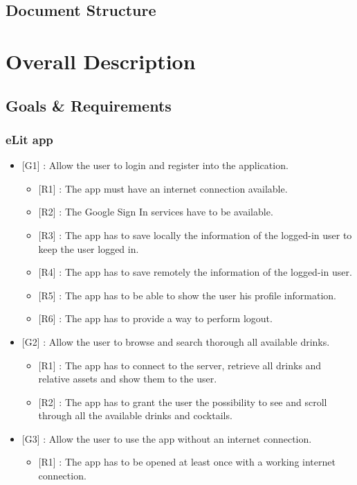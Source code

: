 \documentclass[paper=a4, fontsize=12pt]{scrartcl}
\numberwithin{equation}{section}		%
\numberwithin{figure}{section}			%
\numberwithin{table}{section}				%
\begin{document}
\subsection{Document Structure}
\newpage

\section{Overall Description}
\subsection{Goals \& Requirements}
\subsubsection{eLit app}
\begin{itemize}
\item {[G1]} : Allow the user to login and register into the application.
\begin{itemize}
\item {[R1]} : The app must have an internet connection available.
\item {[R2]} : The Google Sign In services have to be available.
\item {[R3]} : The app has to save locally the information of the logged-in user to keep the user logged in.
\item {[R4]} : The app has to save remotely the information of the logged-in user.
\item {[R5]} : The app has to be able to show the user his profile information.
\item {[R6]} : The app has to provide a way to perform logout.
\end{itemize}
\item {[G2]} : Allow the user to browse and search thorough all available drinks.
\begin{itemize}
\item {[R1]} : The app has to connect to the server, retrieve all drinks and relative assets and show them to the user.
\item {[R2]} : The app has to grant the user the possibility to see and scroll through all the available drinks and cocktails.
\end{itemize}
\item {[G3]} : Allow the user to use the app without an internet connection.
\begin{itemize}
\item {[R1]} : The app has to be opened at least once with a working internet connection.

\end{itemize}
\end{itemize}
\end{document}
